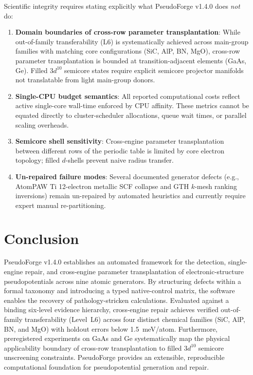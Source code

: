 \documentclass[3p,twocolumn]{elsarticle}
\begin{document}
Scientific integrity requires stating explicitly what PseudoForge v1.4.0 does \textit{not} do:
\begin{enumerate}\setlength{\itemsep}{1pt}\setlength{\parskip}{0pt}
\item \textbf{Domain boundaries of cross-row parameter transplantation}: While out-of-family transferability (L6) is systematically achieved across main-group families with matching core configurations (SiC, AlP, BN, MgO), cross-row parameter transplantation is bounded at transition-adjacent elements (GaAs, Ge). Filled $3d^{10}$ semicore states require explicit semicore projector manifolds not translatable from light main-group donors.
\item \textbf{Single-CPU budget semantics}: All reported computational costs reflect active single-core wall-time enforced by CPU affinity. These metrics cannot be equated directly to cluster-scheduler allocations, queue wait times, or parallel scaling overheads.
\item \textbf{Semicore shell sensitivity}: Cross-engine parameter transplantation between different rows of the periodic table is limited by core electron topology; filled $d$-shells prevent naive radius transfer.
\item \textbf{Un-repaired failure modes}: Several documented generator defects (e.g., AtomPAW Ti 12-electron metallic SCF collapse and GTH $k$-mesh ranking inversions) remain un-repaired by automated heuristics and currently require expert manual re-partitioning.
\end{enumerate}

\section{Conclusion}

PseudoForge v1.4.0 establishes an automated framework for the detection, single-engine repair, and cross-engine parameter transplantation of electronic-structure pseudopotentials across nine atomic generators. By structuring defects within a formal taxonomy and introducing a typed native-control matrix, the software enables the recovery of pathology-stricken calculations. Evaluated against a binding six-level evidence hierarchy, cross-engine repair achieves verified out-of-family transferability (Level~L6) across four distinct chemical families (SiC, AlP, BN, and MgO) with holdout errors below 1.5~meV/atom. Furthermore, preregistered experiments on GaAs and Ge systematically map the physical applicability boundary of cross-row transplantation to filled $3d^{10}$ semicore unscreening constraints. PseudoForge provides an extensible, reproducible computational foundation for pseudopotential generation and repair.
\end{document}

